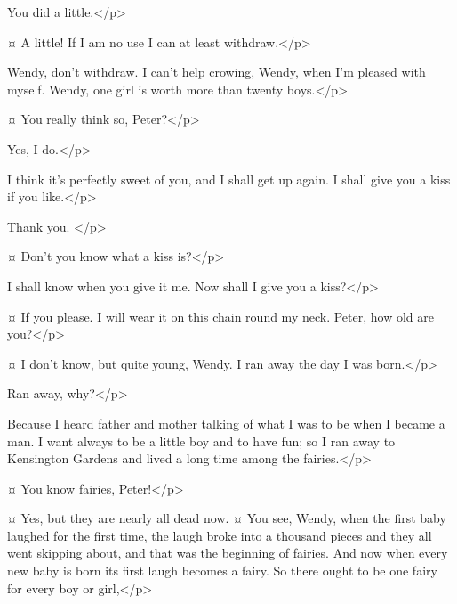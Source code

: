 \begin{drama}
\peterspeaks
You did a little.</p>

\wendyspeaks {}¤
A little!
If I am no use I can at least withdraw.</p>


\peterspeaks
Wendy, don't withdraw.
I can't help crowing, Wendy, when I'm pleased with myself.
Wendy, one girl is worth more than twenty boys.</p>

\wendyspeaks {}¤
You really think so, Peter?</p>

\peterspeaks
Yes, I do.</p>

\wendyspeaks
I think it's perfectly sweet of you, and I shall get up again.
I shall give you a kiss if you like.</p>

\peterspeaks
Thank you.
</p>

\wendyspeaks {}¤
Don't you know what a kiss is?</p>

\peterspeaks
I shall know when you give it me.
Now shall I give you a kiss?</p>

\wendyspeaks {}¤
If you please.
I will wear it on this chain round my neck.
Peter, how old are you?</p>

\peterspeaks {}¤
I don't know, but quite young, Wendy.
I ran away the day I was born.</p>

\wendyspeaks
Ran away, why?</p>

\peterspeaks
Because I heard father and mother talking of what I was to be when I became a man.
I want always to be a little boy and to have fun; so I ran away to Kensington Gardens and lived a long time among the fairies.</p>

\wendyspeaks {}¤
You know fairies, Peter!</p>

\peterspeaks {}¤
Yes, but they are nearly all dead now.
¤
You see, Wendy, when the first baby laughed for the first time, the laugh broke into a thousand pieces and they all went skipping about, and that was the beginning of fairies.
And now when every new baby is born its first laugh becomes a fairy.
So there ought to be one fairy for every boy or girl,</p>


\end{drama}
